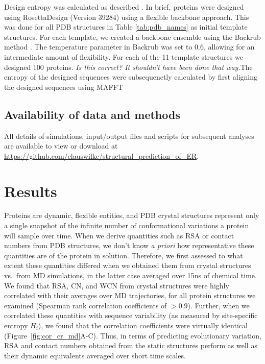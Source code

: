 \documentclass[12pt]{article}
\begin{document}
Design entropy was calculated as described \citep{Jacksonetal2013}. In brief, proteins were designed using RosettaDesign (Version 39284) \citep{leaver-fay_rosetta3:_2011} using a flexible backbone approach. This was done for all PDB structures in Table \ref{tab:pdb_names} as initial template structures. For each template, we created a backbone ensemble using the Backrub method \citep{smith_backrub-like_2008}. The temperature parameter in Backrub was set to 0.6, allowing for an intermediate amount of flexibility.  For each of the 11 template structures we designed 100 proteins. {\color{red}\emph{Is this correct? It shouldn't have been done that way.}The entropy of the designed sequences were subsequenctly calculated by first aligning the designed sequences using MAFFT}

\subsection*{Availability of data and methods}

All details of simulations, input$/$output files and scripts for subsequent analyses are available to view or download at \url{https://github.com/clauswilke/structural\_prediction\_of\_ER}.

\section*{Results}

Proteins are dynamic, flexible entities, and PDB crystal structures represent only a single snapshot of the infinite number of conformational variations a protein will sample over time. When we derive quantities such as RSA or contact numbers from PDB structures, we don't know \emph{a priori} how representative these quantities are of the protein in solution. Therefore, we first assessed to what extent these quantities differed when we obtained them from crystal structures vs.\ from MD simulations, in the latter case averaged over 15ns of chemical time. We found that RSA, CN, and WCN from crystal structures were highly correlated with their averages over MD trajectories, for all protein structures we examined (Spearman rank correlation coefficients of $>0.9$). Further, when we correlated these quantities with sequence variability (as measured by site-specific entropy $H_i$), we found that the correlation coefficients were virtually identical (Figure~\ref{fig:cor_cr_md}A-C). Thus, in terms of predicting evolutionary variation, RSA and contact numbers obtained from the static structures perform as well as their dynamic equivalents averaged over short time scales.
\end{document}
